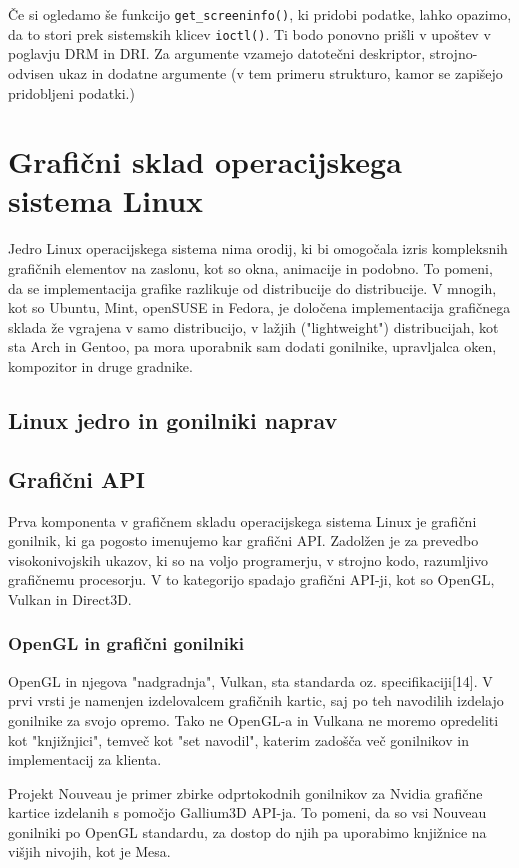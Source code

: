 \documentclass{article}
\begin{document}
Če si ogledamo še funkcijo \lstinline{get_screeninfo()}, ki pridobi podatke, lahko opazimo, da to stori prek sistemskih klicev \lstinline{ioctl()}. Ti bodo ponovno prišli v upoštev v poglavju DRM in DRI. Za argumente vzamejo datotečni deskriptor, strojno-odvisen ukaz in dodatne argumente (v tem primeru strukturo, kamor se zapišejo pridobljeni podatki.)

\section{Grafični sklad operacijskega sistema Linux}
Jedro Linux operacijskega sistema nima orodij, ki bi omogočala izris kompleksnih grafičnih elementov na zaslonu, kot so okna, animacije in podobno. To pomeni, da se implementacija grafike razlikuje od distribucije do distribucije. V mnogih, kot so Ubuntu, Mint, openSUSE in Fedora, je določena implementacija grafičnega sklada že vgrajena v samo distribucijo, v lažjih ("lightweight") distribucijah, kot sta Arch in Gentoo, pa mora uporabnik sam dodati gonilnike, upravljalca oken, kompozitor in druge gradnike.

\subsection{Linux jedro in gonilniki naprav}

\subsection{Grafični API}
Prva komponenta v grafičnem skladu operacijskega sistema Linux je grafični gonilnik, ki ga pogosto imenujemo kar grafični API. Zadolžen je za prevedbo visokonivojskih ukazov, ki so na voljo programerju, v strojno kodo, razumljivo grafičnemu procesorju.
V to kategorijo spadajo grafični API-ji, kot so OpenGL, Vulkan in Direct3D.

\subsubsection{OpenGL in grafični gonilniki}
OpenGL in njegova "nadgradnja", Vulkan, sta standarda oz. specifikaciji[14]. V prvi vrsti je namenjen izdelovalcem grafičnih kartic, saj po teh navodilih izdelajo gonilnike za svojo opremo. Tako ne OpenGL-a in Vulkana ne moremo opredeliti kot "knjižnjici", temveč kot "set navodil", katerim zadošča več gonilnikov in implementacij za klienta.

Projekt Nouveau je primer zbirke odprtokodnih gonilnikov za Nvidia grafične kartice izdelanih s pomočjo Gallium3D API-ja. To pomeni, da so vsi Nouveau gonilniki po OpenGL standardu, za dostop do njih pa uporabimo knjižnice na višjih nivojih, kot je Mesa.
\end{document}
